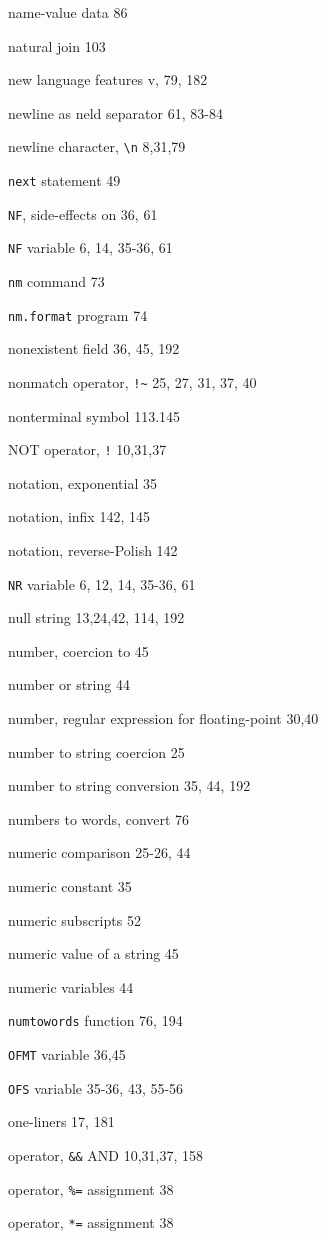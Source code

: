 \begin{multicols}{3}
name-value data 86

natural join 103

new language features v, 79, 182

newline as neld separator 61,  83-84

newline character, \verb'\n' 8,31,79

\verb'next' statement 49

\verb'NF', side-effects on 36, 61

\verb'NF' variable 6, 14, 35-36, 61

\verb'nm' command 73

\verb'nm.format' program 74


nonexistent field 36, 45, 192

nonmatch operator, \verb'!~' 25, 27, 31, 37, 40

nonterminal symbol 113.145

NOT operator, \verb'!' 10,31,37

notation, exponential 35

notation, infix 142, 145

notation, reverse-Polish 142

\verb'NR' variable 6, 12, 14, 35-36, 61

null string 13,24,42, 114, 192

number, coercion to 45

number or string 44

number, regular expression for floating-point 30,40

number to string coercion 25

number to string conversion 35,  44, 192

numbers to words, convert 76

numeric comparison 25-26, 44

numeric constant 35

numeric subscripts 52

numeric value of a string 45

numeric variables 44

\verb'numtowords' function 76, 194

\verb'OFMT' variable 36,45

\verb'OFS' variable 35-36, 43, 55-56

one-liners 17, 181

operator, \verb'&&' AND 10,31,37, 158

operator, \verb'%=' assignment 38

operator, \verb'*=' assignment 38


\end{multicols}
